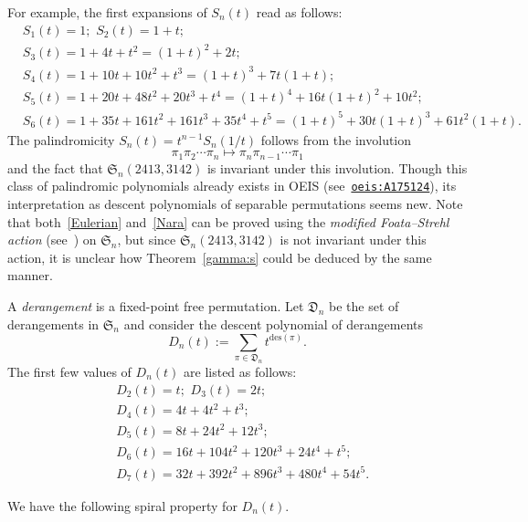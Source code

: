 \documentclass[12pt]{amsart}
\numberwithin{equation}{section}
\theoremstyle{plain}
\theoremstyle{definition}
\def\des{\mathrm{des}}
\def\S{\mathfrak{S}}
\def\D{\mathfrak{D}}
\begin{document}
For example, the first expansions  of $S_n(t)$  read as follows:
\begin{align*}
&S_1(t)=1; \,\,S_2(t)=1+t;\\
&S_3(t)=1+4t+t^2=(1+t)^2+2t;\\
&S_4(t)=1+10t+10t^2+t^3=(1+t)^3+7t(1+t);\\
&S_5(t)=1+20t+48t^2+20t^3+t^4=(1+t)^4+16t(1+t)^2+10t^2;\\
&S_6(t)=1+35t+161t^2+161t^3+35t^4+t^5=(1+t)^5+30t(1+t)^3+61t^2(1+t).
\end{align*}
The palindromicity $S_n(t)=t^{n-1}S_n(1/t)$ follows from the involution
$$
\pi_1\pi_2\cdots\pi_n\mapsto\pi_n\pi_{n-1}\cdots\pi_1
$$
and the fact that $\S_n(2413,3142)$ is invariant under this involution. Though this class of palindromic polynomials already exists in OEIS 
(see~\href{https://oeis.org/A175124}{\tt{oeis:A175124}}), its interpretation as descent polynomials of separable permutations seems new. 
Note that  both~\eqref{Eulerian} and~\eqref{Nara} can be proved  using the {\em modified Foata--Strehl action} (see~\cite{fsh,br,linzen15}) on  $\S_n$, but since $\S_n(2413,3142)$ is not invariant under this action,  it is unclear how Theorem~\ref{gamma:s} could be deduced by the same manner. 


A {\em derangement} is a fixed-point free permutation. Let $\D_n$ be the set of derangements in $\S_n$ and 
consider   the descent polynomial of derangements 
$$
D_n(t):=\sum_{\pi\in\D_n}t^{\des(\pi)}.
$$
The first few values of $D_n(t)$ are listed as follows: 
\begin{align*}
&D_2(t)=t; \,\,D_3(t)=2t; \\
&D_4(t)=4t+4t^2+t^3;\\
&D_5(t)=8t+24t^2+12t^3;\\
&D_6(t)=16t+104t^2+120t^3+24t^4+t^5;\\
&D_7(t)=32t+392t^2+896t^3+480t^4+54t^5.
\end{align*}

We have the following spiral property for $D_n(t)$. 
 
\end{document}
